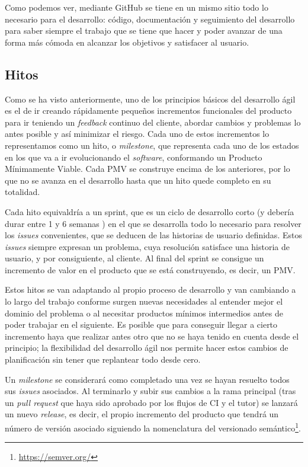 Como podemos ver, mediante GitHub se tiene en un mismo sitio todo lo necesario para el desarrollo: código, documentación y seguimiento del desarrollo para saber siempre el trabajo que se tiene que hacer y poder avanzar de una forma más cómoda en alcanzar los objetivos y satisfacer al usuario. 

\subsection{Hitos}
Como se ha visto anteriormente, uno de los principios básicos del desarrollo
ágil es el de ir creando rápidamente pequeños incrementos funcionales del
producto para ir teniendo un \textit{feedback} continuo del cliente, abordar
cambios y problemas lo antes posible y así minimizar el riesgo. Cada uno de
estos incrementos lo representamos como un hito, o \textit{milestone}, que
representa cada uno de los estados en los que va a ir evolucionando el
\textit{software}, conformando un Producto Mínimamente Viable. Cada PMV se
construye encima de los anteriores, por lo que no se avanza en el desarrollo
hasta que un hito quede completo en su totalidad. 

Cada hito equivaldría a un sprint, que es un ciclo de desarrollo corto (y
debería durar entre 1 y 6 semanas \cite{abrahamsson2017agile}) en el que se
desarrolla todo lo necesario para resolver los \textit{issues} convenientes, que
se deducen de las historias de usuario definidas. Estos \textit{issues} siempre
expresan un problema, cuya resolución satisface una historia de usuario, y por
consiguiente, al cliente. Al final del sprint se consigue un incremento de valor
en el producto que se está construyendo, es decir, un PMV. 

Estos hitos se van adaptando al propio proceso de desarrollo y van cambiando a
lo largo del trabajo conforme surgen nuevas necesidades al entender mejor el
dominio del problema o al necesitar productos mínimos intermedios antes de poder
trabajar en el siguiente. Es posible que para conseguir llegar a cierto
incremento haya que realizar antes otro que no se haya tenido en cuenta desde el
principio; la flexibilidad del desarrollo ágil nos permite hacer estos cambios
de planificación sin tener que replantear todo desde cero.

Un \textit{milestone} se considerará como completado una vez se hayan resuelto todos sus \textit{issues} asociados. Al terminarlo y subir sus cambios a la rama principal (tras un \textit{pull request} que haya sido aprobado por los flujos de CI y el tutor) se lanzará un nuevo \textit{release}, es decir, el propio incremento del producto que tendrá un número de versión asociado siguiendo la nomenclatura del versionado semántico\footnote{\url{https://semver.org/}}.

